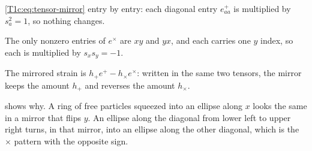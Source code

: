 \begin{explain}
  \item \eqref{T1c:eq:tensor-mirror} entry by entry: each diagonal entry $e^+_{aa}$ is multiplied by $s_a^2=1$, so nothing changes.
  \item The only nonzero entries of $e^\times$ are $xy$ and $yx$, and each carries one $y$ index, so each is multiplied by $s_xs_y=-1$.
  \item The mirrored strain is $h_+e^+-h_\times e^\times$: written in the same two tensors, the mirror keeps the amount $h_+$ and reverses the amount $h_\times$.
\end{explain}
 shows why. A ring of free particles squeezed into an ellipse along $x$ looks the same in a mirror that flips $y$. An ellipse along the diagonal from lower left to upper right turns, in that mirror, into an ellipse along the other diagonal, which is the $\times$ pattern with the opposite sign.

